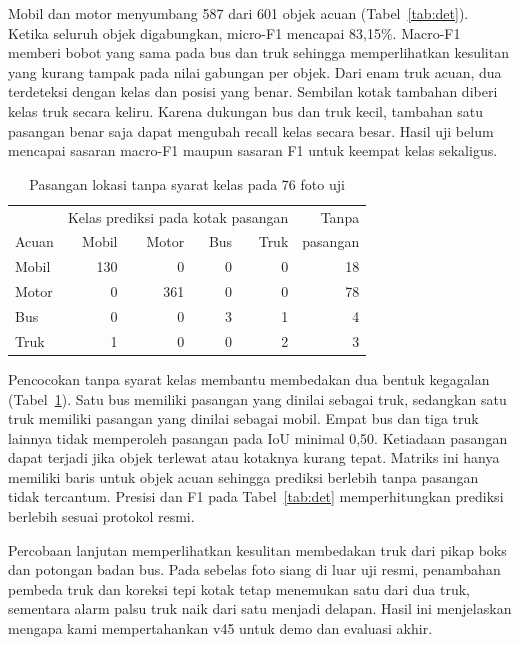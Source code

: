 \documentclass[conference,a4paper]{IEEEtran}
\begin{document}
Mobil dan motor menyumbang 587 dari 601 objek acuan (Tabel~\ref{tab:det}). Ketika seluruh objek digabungkan, micro-F1 mencapai 83,15\%. Macro-F1 memberi bobot yang sama pada bus dan truk sehingga memperlihatkan kesulitan yang kurang tampak pada nilai gabungan per objek. Dari enam truk acuan, dua terdeteksi dengan kelas dan posisi yang benar. Sembilan kotak tambahan diberi kelas truk secara keliru. Karena dukungan bus dan truk kecil, tambahan satu pasangan benar saja dapat mengubah recall kelas secara besar. Hasil uji belum mencapai sasaran macro-F1 maupun sasaran F1 untuk keempat kelas sekaligus.

\begin{table}[tb]
\centering\caption{Pasangan lokasi tanpa syarat kelas pada 76 foto uji}
\label{tab:diag}
\footnotesize\setlength{\tabcolsep}{4pt}
\begin{tabular}{lrrrrr}\toprule
 & \multicolumn{4}{c}{Kelas prediksi pada kotak pasangan} & Tanpa\\
Acuan & Mobil & Motor & Bus & Truk & pasangan\\\midrule
Mobil & 130 & 0 & 0 & 0 & 18\\
Motor & 0 & 361 & 0 & 0 & 78\\
Bus & 0 & 0 & 3 & 1 & 4\\
Truk & 1 & 0 & 0 & 2 & 3\\\bottomrule
\end{tabular}
\end{table}

Pencocokan tanpa syarat kelas membantu membedakan dua bentuk kegagalan (Tabel~\ref{tab:diag}). Satu bus memiliki pasangan yang dinilai sebagai truk, sedangkan satu truk memiliki pasangan yang dinilai sebagai mobil. Empat bus dan tiga truk lainnya tidak memperoleh pasangan pada IoU minimal 0,50. Ketiadaan pasangan dapat terjadi jika objek terlewat atau kotaknya kurang tepat. Matriks ini hanya memiliki baris untuk objek acuan sehingga prediksi berlebih tanpa pasangan tidak tercantum. Presisi dan F1 pada Tabel~\ref{tab:det} memperhitungkan prediksi berlebih sesuai protokol resmi.

Percobaan lanjutan memperlihatkan kesulitan membedakan truk dari pikap boks dan potongan badan bus. Pada sebelas foto siang di luar uji resmi, penambahan pembeda truk dan koreksi tepi kotak tetap menemukan satu dari dua truk, sementara alarm palsu truk naik dari satu menjadi delapan. Hasil ini menjelaskan mengapa kami mempertahankan v45 untuk demo dan evaluasi akhir.
\end{document}
